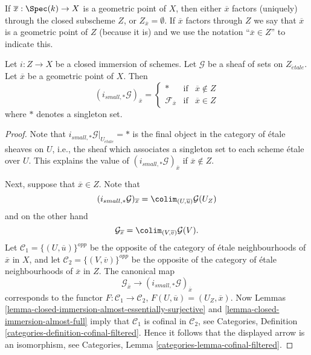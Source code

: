 \noindent
If $\overline{x} : \Spec(k) \to X$ is a geometric point of $X$, then
either $\overline{x}$ factors (uniquely) through the closed subscheme $Z$, or
$Z_{\overline{x}} = \emptyset$. If $\overline{x}$ factors through $Z$
we say that $\overline{x}$ is a geometric point of $Z$ (because it is) and
we use the notation ``$\overline{x} \in Z$'' to indicate this.

\begin{lemma}
\label{lemma-stalk-pushforward-closed-immersion}
Let $i : Z \to X$ be a closed immersion of schemes.
Let $\mathcal{G}$ be a sheaf of sets on $Z_{\acute{e}tale}$.
Let $\overline{x}$ be a geometric point of $X$.
Then
$$
(i_{small, *}\mathcal{G})_{\overline{x}} =
\left\{
\begin{matrix}
* & \text{if} & \overline{x} \not \in Z \\
\mathcal{F}_{\overline{x}} & \text{if} & \overline{x} \in Z
\end{matrix}
\right.
$$
where $*$ denotes a singleton set.
\end{lemma}

\begin{proof}
Note that $i_{small, *}\mathcal{G}|_{U_{\acute{e}tale}} = *$ is the final
object in the category of \'etale sheaves on $U$, i.e., the sheaf
which associates a singleton set to each scheme \'etale over $U$.
This explains the value of $(i_{small, *}\mathcal{G})_{\overline{x}}$
if $\overline{x} \not \in Z$.

\medskip\noindent
Next, suppose that $\overline{x} \in Z$. Note that
$$
(i_{small, *}\mathcal{G})_{\overline{x}}
=
\colim_{(U, \overline{u})} \mathcal{G}(U_Z)
$$
and on the other hand
$$
\mathcal{G}_{\overline{x}}
=
\colim_{(V, \overline{v})} \mathcal{G}(V).
$$
Let $\mathcal{C}_1 = \{(U, \overline{u})\}^{opp}$ be the opposite of the
category of \'etale neighbourhoods of $\overline{x}$ in $X$, and let
$\mathcal{C}_2 = \{(V, \overline{v})\}^{opp}$ be the opposite of the
category of \'etale neighbourhoods of $\overline{x}$ in $Z$. The canonical map
$$
\mathcal{G}_{\overline{x}}
\longrightarrow
(i_{small, *}\mathcal{G})_{\overline{x}}
$$
corresponds to the functor $F : \mathcal{C}_1 \to \mathcal{C}_2$,
$F(U, \overline{u}) = (U_Z, \overline{x})$. Now
Lemmas \ref{lemma-closed-immersion-almost-essentially-surjective} and
\ref{lemma-closed-immersion-almost-full}
imply that $\mathcal{C}_1$ is cofinal in $\mathcal{C}_2$, see
Categories, Definition \ref{categories-definition-cofinal-filtered}.
Hence it follows that the displayed arrow is an isomorphism, see
Categories, Lemma \ref{categories-lemma-cofinal-filtered}.
\end{proof}

